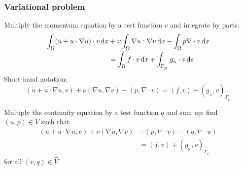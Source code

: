 \begin{frame}
  \frametitle{Variational problem}

  Multiply the momentum equation by a test function $v$ and integrate
  by parts:
  \begin{align*}
    \int_{\Omega}  (\dot{u} + u \cdot \nabla u ) \cdot v \, \mathrm{d}x
    &+ \nu \int_{\Omega}\nabla u : \nabla u \, \mathrm{d}x
    - \int_{\Omega} p \nabla \cdot v  \, \mathrm{d}x
    \\
    &= \int_{\Omega} f \cdot v \, \mathrm{d}x
    + \int_{\Gamma_{_\mathrm{N}}} g_{_{\mathrm{N}}} \cdot v \, \mathrm{d}s
  \end{align*}
  Short-hand notation:
  \begin{equation*}
    (\dot{u} + u \cdot \nabla u,v)  + \nu (\nabla u, \nabla v)
    - (p,\nabla \cdot v) = (f,v) + (g_{_{\mathrm{N}}},v)_{\Gamma_{_{\mathrm{N}}}}
  \end{equation*}

  Multiply the continuity equation by a test function $q$ and sum up:
  find $(u, p) \in V$ such that
  \begin{align*}
    (\dot{u} + u \cdot \nabla u,v) + \nu (\nabla u, \nabla v)
    &- (p,\nabla \cdot v)- (q,\nabla \cdot u) 
    \\
    &= (f,v) + (g_{_{\mathrm{N}}},v)_{\Gamma_{_{\mathrm{N}}}}
  \end{align*}
  for all $(v, q) \in \hat{V}$
\end{frame}
